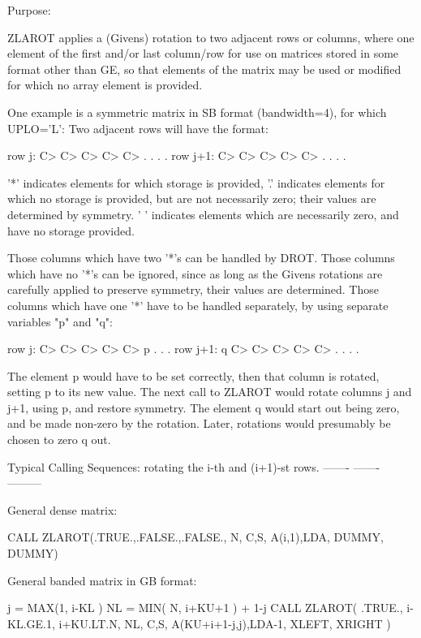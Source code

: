 \begin{DoxyParagraph}{Purpose\+: }
\begin{DoxyVerb}    ZLAROT applies a (Givens) rotation to two adjacent rows or
    columns, where one element of the first and/or last column/row
    for use on matrices stored in some format other than GE, so
    that elements of the matrix may be used or modified for which
    no array element is provided.

    One example is a symmetric matrix in SB format (bandwidth=4), for
    which UPLO='L':  Two adjacent rows will have the format:

    row j:     C> C> C> C> C> .  .  .  .
    row j+1:      C> C> C> C> C> .  .  .  .

    '*' indicates elements for which storage is provided,
    '.' indicates elements for which no storage is provided, but
    are not necessarily zero; their values are determined by
    symmetry.  ' ' indicates elements which are necessarily zero,
     and have no storage provided.

    Those columns which have two '*'s can be handled by DROT.
    Those columns which have no '*'s can be ignored, since as long
    as the Givens rotations are carefully applied to preserve
    symmetry, their values are determined.
    Those columns which have one '*' have to be handled separately,
    by using separate variables "p" and "q":

    row j:     C> C> C> C> C> p  .  .  .
    row j+1:   q  C> C> C> C> C> .  .  .  .

    The element p would have to be set correctly, then that column
    is rotated, setting p to its new value.  The next call to
    ZLAROT would rotate columns j and j+1, using p, and restore
    symmetry.  The element q would start out being zero, and be
    made non-zero by the rotation.  Later, rotations would presumably
    be chosen to zero q out.

    Typical Calling Sequences: rotating the i-th and (i+1)-st rows.
    ------- ------- ---------

      General dense matrix:

              CALL ZLAROT(.TRUE.,.FALSE.,.FALSE., N, C,S,
                      A(i,1),LDA, DUMMY, DUMMY)

      General banded matrix in GB format:

              j = MAX(1, i-KL )
              NL = MIN( N, i+KU+1 ) + 1-j
              CALL ZLAROT( .TRUE., i-KL.GE.1, i+KU.LT.N, NL, C,S,
                      A(KU+i+1-j,j),LDA-1, XLEFT, XRIGHT )


\end{DoxyVerb}
\end{DoxyParagraph}
